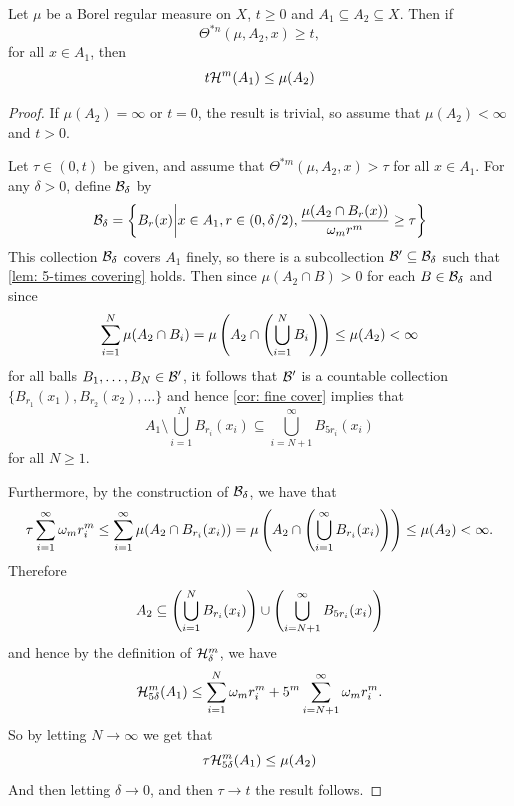 \begin{theorem}\label{thm: upper density connection}
Let $\mu$ be a Borel regular measure on $X$, $t \ge 0$ and $A_1 \subseteq A_2 \subseteq X$. Then if
\[
    \Theta^{*n}(\mu,A_2,x) \ge t,
\]
for all $x \in A_1$, then
\[
    t\mathcal{H}^m(A_1) \le \mu(A_2)
\]
\end{theorem}
\begin{proof}
If $\mu(A_2)=\infty$ or $t=0$, the result is trivial, so assume that $\mu(A_2)<\infty$ and $t>0$.

Let $\tau \in (0,t)$ be given, and assume that $\Theta^{*m}(\mu,A_2,x) > \tau$ for all $x \in A_1$. For any $\delta > 0$, define $\mathcal{B}_{\delta}$ by
\[
    \mathcal{B}_{\delta} = \left\{ B_r(x) \middle| x \in A_1, r \in (0,\delta/2), \frac{\mu(A_2 \cap B_r(x))}{\omega_mr^m} \ge \tau \right\}
\]
This collection $\mathcal{B}_{\delta}$ covers $A_1$ finely, so there is a subcollection $\mathcal{B}' \subseteq \mathcal{B}_{\delta}$ such that \cref{lem: 5-times covering} holds. Then since $\mu(A_2\cap B) > 0$ for each $B \in \mathcal{B}_{\delta}$ and since 
\[
    \sum_{i=1}^{N} \mu(A_2 \cap B_i) = \mu\left(A_2 \cap \left(\bigcup_{i=1}^N B_i \right) \right) \le \mu(A_2) < \infty
\]
for all balls $B_1, \dots, B_N \in \mathcal{B}'$, it follows that $\mathcal{B}'$ is a countable collection $\{B_{r_1}(x_1), B_{r_2}(x_2), \dots\}$ and hence \cref{cor: fine cover} implies that
\[
    A_1 \setminus \bigcup_{i=1}^N B_{r_i}(x_i) \subseteq \bigcup_{i=N+1}^{\infty} B_{5r_i}(x_i)
\]
for all $N \ge 1$.

Furthermore, by the construction of $\mathcal{B}_{\delta}$, we have that
\[
    \tau \sum_{i=1}^{\infty} \omega_m r_i^m \le \sum_{i=1}^{\infty} \mu(A_2 \cap B_{r_i}(x_i)) = \mu\left(A_2 \cap \left(\bigcup_{i=1}^{\infty} B_{r_i}(x_i) \right)\right) \le \mu(A_2) < \infty.
\]
Therefore
\[
    A_2 \subseteq \left(\bigcup_{i=1}^N B_{r_i}(x_i) \right) \cup \left(\bigcup_{i=N+1}^{\infty} B_{5r_i}(x_i)\right)
\]
and hence by the definition of $\mathcal{H}^m_{\delta}$, we have
\[
    \mathcal{H}^m_{5\delta}(A_1) \le \sum_{i=1}^N \omega_m r_i^m + 5^m \sum_{i=N+1}^{\infty} \omega_m r_i^m.
\]
So by letting $N \to \infty$ we get that
\[
    \tau \mathcal{H}^m_{5\delta}(A_1) \le \mu(A_2)
\]
And then letting $\delta \to 0$, and then $\tau \to t$ the result follows.
\end{proof}

